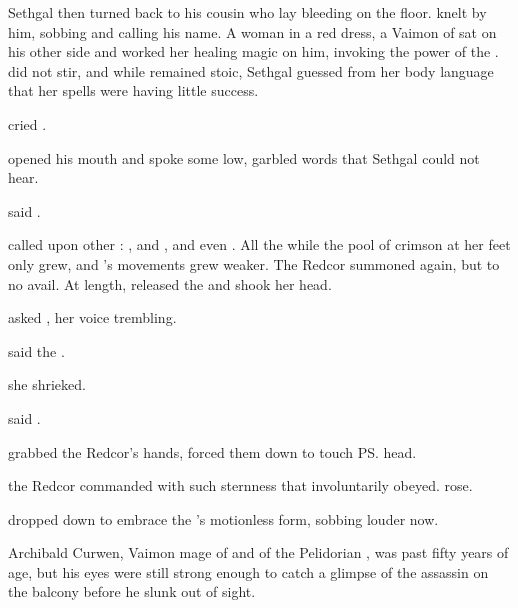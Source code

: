 Sethgal then turned back to his cousin who lay bleeding on the floor. 
\Tiroco knelt by him, sobbing and calling his name. 
A \human woman in a red dress\dash\ClariceCamilienne, a Vaimon of \ClanRedcor\dash sat on his other side and worked her healing magic on him, invoking the power of the \sephirah \Ishiel.
\Icor did not stir, and while \Camilienne remained stoic, Sethgal guessed from her body language that her spells were having little success. 

\talk{\Icor!} cried \Tiroco.

\Icor opened his mouth and spoke some low, garbled words that Sethgal could not hear. 

 said \Tiroco.

\Camilienne called upon other \sephiroth: 
\Zumrad, and \Nomariel, and even \Teshiron. 
All the while the pool of crimson at her feet only grew, and \Icor's movements grew weaker. 
The Redcor \cleric summoned \Ishiel again, but to no avail. 
At length, \Camilienne released the \rayuth and shook her head. 

 asked \Tiroco, her voice trembling. 

 said the \soror.

 she shrieked. 

 said \Camilienne. 

\Tiroco{} grabbed the Redcor's hands, forced them down to touch \ps{\Icor}{} head. 

 the Redcor commanded with such sternness that \Tiroco involuntarily obeyed. 
\Camilienne{} rose. 

\Tiroco{} dropped down to embrace the \rayuth's motionless form, sobbing louder now. 




\begin{comment}
\subsection{Curwen catches the assassin}
\end{comment}
\new
Archibald Curwen, Vaimon mage of \ClanTelcra and of the Pelidorian \ishrah, was past fifty years of age, but his eyes were still strong enough to catch a glimpse of the assassin on the balcony before he slunk out of sight. 


